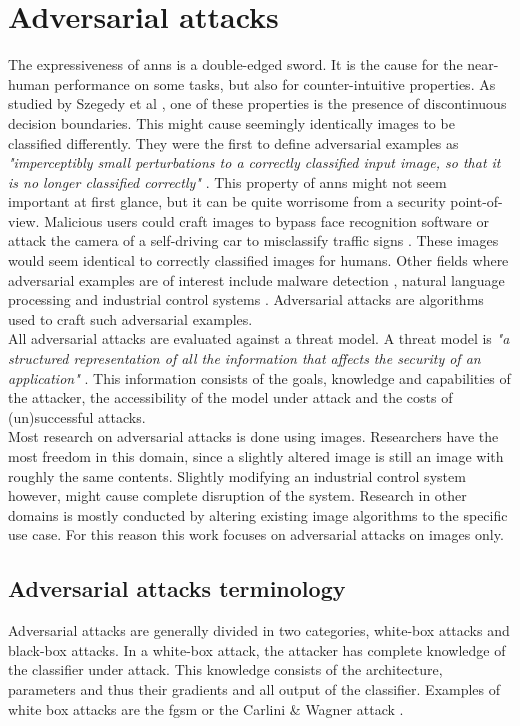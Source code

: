 \section{Adversarial attacks}
The expressiveness of \glspl{ann} is a double-edged sword. It is the cause for the near-human performance on some tasks, but also for counter-intuitive properties. As studied by Szegedy et al \cite{szegedy2014intriguing}, one of these properties is the presence of discontinuous decision boundaries. This might cause seemingly identically images to be classified differently. They were the first to define adversarial examples as \textit{"imperceptibly small perturbations to a correctly classified input image, so that it is no longer classified correctly"} \cite{szegedy2014intriguing}. This property of \glspl{ann} might not seem important at first glance, but it can be quite worrisome from a security point-of-view. Malicious users could craft images to bypass face recognition software \cite{face_recognition} or attack the camera of a self-driving car to misclassify traffic signs \cite{traffic_signs}. These images would seem identical to correctly classified images for humans. Other fields where adversarial examples are of interest include malware detection \cite{malware_detection}, natural language processing \cite{adversarial_nlp} and industrial control systems \cite{adversarial_industrial_control_system}. Adversarial attacks are algorithms used to craft such adversarial examples.\\ 

All adversarial attacks are evaluated against a threat model. A threat model is \textit{"a structured representation of all the information that affects the security of an application"} \cite{threat_model}. This information consists of the goals, knowledge and capabilities of the attacker, the accessibility of the model under attack and the costs of (un)successful attacks.\\

Most research on adversarial attacks is done using images. Researchers have the most freedom in this domain, since a slightly altered image is still an image with roughly the same contents. Slightly modifying an industrial control system however, might cause complete disruption of the system. Research in other domains is mostly conducted by altering existing image algorithms to the specific use case. For this reason this work focuses on adversarial attacks on images only.\\ 


\subsection{Adversarial attacks terminology}
Adversarial attacks are generally divided in two categories, white-box attacks and black-box attacks. In a white-box attack, the attacker has complete knowledge of the classifier under attack. This knowledge consists of the architecture, parameters and thus their gradients and all output of the classifier. Examples of white box attacks are the \gls{fgsm} \cite{FGSM} or the Carlini \& Wagner attack \cite{cw_attack}.\\

